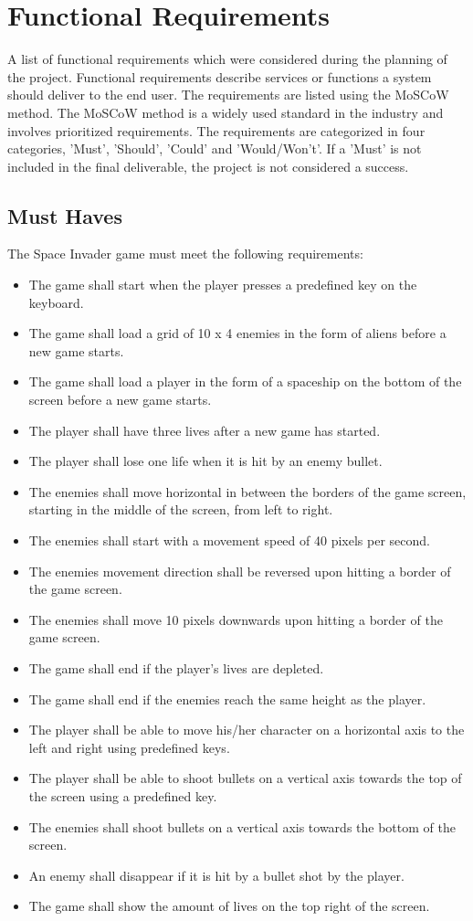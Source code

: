 \section{Functional Requirements}

A list of functional requirements which were considered during the planning of the project. Functional requirements describe services or functions a system should deliver to the end user. The requirements are listed using the MoSCoW method. The MoSCoW method is a widely used standard in the industry and involves prioritized requirements. The requirements are categorized in four categories, 'Must', 'Should', 'Could' and 'Would/Won't'. If a 'Must' is not included in the final deliverable, the project is not considered a success.

\subsection{Must Haves}
The Space Invader game must meet the following requirements:
\begin{itemize}
	\item The game shall start when the player presses a predefined  key on the keyboard.
	\item The game shall load a grid of 10 x 4 enemies in the form of aliens before a new game starts.
	\item The game shall load a player in the form of a spaceship on the bottom of the screen before a new game starts.
	\item The player shall have three lives after a new game has started.
	\item The player shall lose one life when it is hit by an enemy bullet.
	\item The enemies shall move horizontal in between the borders of the game screen, starting in the middle of the screen, from left to right.
	\item The enemies shall start with a movement speed of 40 pixels per second.
	\item The enemies movement direction shall be reversed upon hitting a border of the game screen.
	\item The enemies shall move 10 pixels downwards upon hitting a border of the game screen.
	\item The game shall end if the player's lives are depleted.
	\item The game shall end if the enemies reach the same height as the player.
	\item The player shall be able to move his/her character on a horizontal axis to the left and right using predefined keys.
	\item The player shall be able to shoot bullets on a vertical axis towards the top of the screen using a predefined key.
	\item The enemies shall shoot bullets on a vertical axis towards the bottom of the screen.
	\item An enemy shall disappear if it is hit by a bullet shot by the player.
	\item The game shall show the amount of lives on the top right of the screen.
\end{itemize}

